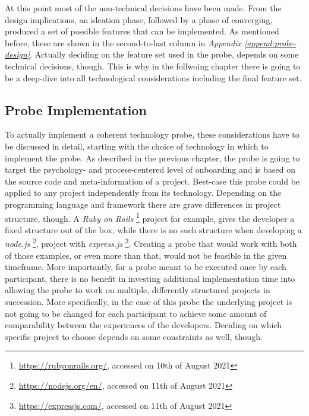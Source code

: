 At this point most of the non-technical decisions have been made. From the design implications, an ideation phase, followed by a phase of converging, produced a set of possible features that can be implemented. As mentioned before, these are shown in the second-to-last column in \textit{Appendix \ref{append:probe-design}}. Actually deciding on the feature set used in the probe, depends on some technical decisions, though. This is why in the follwoing chapter there is going to be a deep-dive into all technological considerations including the final feature set.

\subsection{Probe Implementation}

To actually implement a coherent technology probe, these considerations have to be discussed in detail, starting with the choice of technology in which to implement the probe. As described in the previous chapter, the probe is going to target the psychology- and process-centered level of onboarding and is based on the source code and meta-information of a project. Best-case this probe could be applied to any project independently from its technology. Depending on the programming language and framework there are grave differences in project structure, though. A \textit{Ruby on Rails} \footnote{\url{https://rubyonrails.org/}, accessed on 10th of August 2021} project for example, gives the developer a fixed structure out of the box, while there is no such structure when developing a \textit{node.js} \footnote{\url{https://nodejs.org/en/}, accessed on 11th of August 2021}, project with \textit{express.js} \footnote{\url{https://expressjs.com/}, accessed on 11th of August 2021}. Creating a probe that would work with both of those examples, or even more than that, would not be feasible in the given timeframe. More importantly, for a probe meant to be executed once by each participant, there is no benefit in investing additional implementation time into allowing the probe to work on multiple, differently structured projects in succession. More specifically, in the case of this probe the underlying project is not going to be changed for each participant to achieve some amount of comparability between the experiences of the developers. Deciding on which specific project to choose depends on some constraints as well, though.

